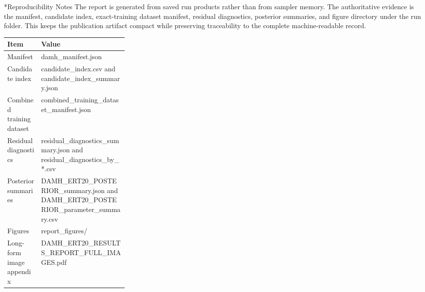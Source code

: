 \documentclass[10pt]{article}
\makeatletter
\renewcommand{\section}{\@startsection{section}{1}{0pt}{1.2em}{0.6em}{\large\bfseries\color{HeadingBlue}}}
\makeatother
\begin{document}
\clearpage
\section*{Reproducibility Notes}
The report is generated from saved run products rather than from sampler memory. The authoritative evidence is the manifest, candidate index, exact-training dataset manifest, residual diagnostics, posterior summaries, and figure directory under the run folder. This keeps the publication artifact compact while preserving traceability to the complete machine-readable record.


\begin{table}[H]
\centering
\small
\begin{tabularx}{\linewidth}{>{\raggedright\arraybackslash}p{0.29\linewidth} X}
\toprule
\rowcolor{TableFill}\textbf{Item} & \textbf{Value}\\
\midrule
Manifest & damh\_\allowbreak{}manifest.json \\
Candidate index & candidate\_\allowbreak{}index.csv and candidate\_\allowbreak{}index\_\allowbreak{}summary.json \\
Combined training dataset & combined\_\allowbreak{}training\_\allowbreak{}dataset\_\allowbreak{}manifest.json \\
Residual diagnostics & residual\_\allowbreak{}diagnostics\_\allowbreak{}summary.json and residual\_\allowbreak{}diagnostics\_\allowbreak{}by\_\allowbreak{}*.csv \\
Posterior summaries & DAMH\_\allowbreak{}ERT20\_\allowbreak{}POSTERIOR\_\allowbreak{}summary.json and DAMH\_\allowbreak{}ERT20\_\allowbreak{}POSTERIOR\_\allowbreak{}parameter\_\allowbreak{}summary.csv \\
Figures & report\_\allowbreak{}figures/ \\
Long-form image appendix & DAMH\_\allowbreak{}ERT20\_\allowbreak{}RESULTS\_\allowbreak{}REPORT\_\allowbreak{}FULL\_\allowbreak{}IMAGES.pdf \\
\bottomrule
\end{tabularx}
\end{table}


\vspace{0.3em}
\noindent{}
\vspace{0.5em}
\end{document}
